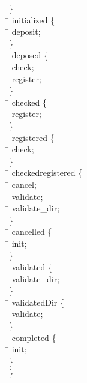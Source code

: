 \begin{program}
\>  \>  \>  \}\\
\>  \>  \>  \=   initialized \{\\
\>  \>  \>  \>  \=    deposit;\\
\>  \>  \>  \}\\
\>  \>  \>  \=   deposed \{\\
\>  \>  \>  \>  \=    check;\\
\>  \>  \>  \>  \=    register;\\
\>  \>  \>  \}\\
\>  \>  \>  \=   checked \{\\
\>  \>  \>  \>  \=    register;\\
\>  \>  \>  \}\\
\>  \>  \>  \=   registered \{\\
\>  \>  \>  \>  \=    check;\\
\>  \>  \>  \}\\
\>  \>  \>  \=   checkedregistered \{\\
\>  \>  \>  \>  \=    cancel;\\
\>  \>  \>  \>  \=    validate;\\
\>  \>  \>  \>  \=    validate_dir;\\
\>  \>  \>  \}\\
\>  \>  \>  \=   cancelled \{\\
\>  \>  \>  \>  \=    init;\\
\>  \>  \>  \}\\
\>  \>  \>  \=   validated \{\\
\>  \>  \>  \>  \=    validate_dir;\\
\>  \>  \>  \}\\
\>  \>  \>  \=   validatedDir \{\\
\>  \>  \>  \>  \=    validate;\\
\>  \>  \>  \}\\
\>  \>  \>  \=   completed \{\\
\>  \>  \>  \>  \=    init;\\
\>  \>  \>  \}\\
\>  \>  \}\\

\end{program}
